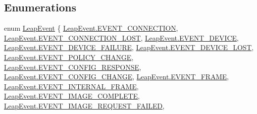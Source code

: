\subsection*{Enumerations}
\begin{DoxyCompactItemize}
\item 
enum \mbox{\hyperlink{namespace_leap_a5b8c8df3b9ace307e29863779a4ae85d}{Leap\+Event}} \{ \newline
\mbox{\hyperlink{namespace_leap_a5b8c8df3b9ace307e29863779a4ae85da7e5995a6e9ec6f29487e367f51d0de65}{Leap\+Event.\+E\+V\+E\+N\+T\+\_\+\+C\+O\+N\+N\+E\+C\+T\+I\+ON}}, 
\mbox{\hyperlink{namespace_leap_a5b8c8df3b9ace307e29863779a4ae85da275f23c8138931ecb2bb347c45024660}{Leap\+Event.\+E\+V\+E\+N\+T\+\_\+\+C\+O\+N\+N\+E\+C\+T\+I\+O\+N\+\_\+\+L\+O\+ST}}, 
\mbox{\hyperlink{namespace_leap_a5b8c8df3b9ace307e29863779a4ae85daf1d70af9c79f849bc0626f29b1fdf230}{Leap\+Event.\+E\+V\+E\+N\+T\+\_\+\+D\+E\+V\+I\+CE}}, 
\mbox{\hyperlink{namespace_leap_a5b8c8df3b9ace307e29863779a4ae85dab37fa782cdde94e2bb7cc192b49e11cb}{Leap\+Event.\+E\+V\+E\+N\+T\+\_\+\+D\+E\+V\+I\+C\+E\+\_\+\+F\+A\+I\+L\+U\+RE}}, 
\newline
\mbox{\hyperlink{namespace_leap_a5b8c8df3b9ace307e29863779a4ae85dacad407b7649a624626a4a1f86251c3d1}{Leap\+Event.\+E\+V\+E\+N\+T\+\_\+\+D\+E\+V\+I\+C\+E\+\_\+\+L\+O\+ST}}, 
\mbox{\hyperlink{namespace_leap_a5b8c8df3b9ace307e29863779a4ae85da25c7add16f6620f7f05ccb92c17629b7}{Leap\+Event.\+E\+V\+E\+N\+T\+\_\+\+P\+O\+L\+I\+C\+Y\+\_\+\+C\+H\+A\+N\+GE}}, 
\mbox{\hyperlink{namespace_leap_a5b8c8df3b9ace307e29863779a4ae85da0d802683603d2b829bf99f53976f0686}{Leap\+Event.\+E\+V\+E\+N\+T\+\_\+\+C\+O\+N\+F\+I\+G\+\_\+\+R\+E\+S\+P\+O\+N\+SE}}, 
\mbox{\hyperlink{namespace_leap_a5b8c8df3b9ace307e29863779a4ae85dae530ce00996bba22643300e5762b29a3}{Leap\+Event.\+E\+V\+E\+N\+T\+\_\+\+C\+O\+N\+F\+I\+G\+\_\+\+C\+H\+A\+N\+GE}}, 
\newline
\mbox{\hyperlink{namespace_leap_a5b8c8df3b9ace307e29863779a4ae85da0f8d2b188b1da6a41fc241c4d116f652}{Leap\+Event.\+E\+V\+E\+N\+T\+\_\+\+F\+R\+A\+ME}}, 
\mbox{\hyperlink{namespace_leap_a5b8c8df3b9ace307e29863779a4ae85da0f3791685eed2591dc590ff3adcf17e7}{Leap\+Event.\+E\+V\+E\+N\+T\+\_\+\+I\+N\+T\+E\+R\+N\+A\+L\+\_\+\+F\+R\+A\+ME}}, 
\mbox{\hyperlink{namespace_leap_a5b8c8df3b9ace307e29863779a4ae85da719421b822ceb785051cf7b585fa039f}{Leap\+Event.\+E\+V\+E\+N\+T\+\_\+\+I\+M\+A\+G\+E\+\_\+\+C\+O\+M\+P\+L\+E\+TE}}, 
\mbox{\hyperlink{namespace_leap_a5b8c8df3b9ace307e29863779a4ae85daccaad2af8c31c2fde06319a05f6efaa7}{Leap\+Event.\+E\+V\+E\+N\+T\+\_\+\+I\+M\+A\+G\+E\+\_\+\+R\+E\+Q\+U\+E\+S\+T\+\_\+\+F\+A\+I\+L\+ED}}, 

\end{DoxyCompactItemize}
